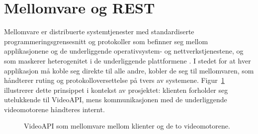 \section{Mellomvare og REST}
\label{sec:mellomvare-rest}


Mellomvare er distribuerte systemtjenester med standardiserte programmeringsgrensesnitt og protokoller som befinner seg mellom applikasjonene og de underliggende operativsystem- og nettverkstjenestene, og som maskerer heterogenitet i de underliggende plattformene \cite{bernstein1996}. I stedet for at hver applikasjon må koble seg direkte til alle andre, kobler de seg til mellomvaren, som håndterer ruting og protokolloversettelse på tvers av systemene. Figur~\ref{fig:mellomvare} illustrerer dette prinsippet i kontekst av prosjektet: klienten forholder seg utelukkende til VideoAPI, mens kommunikasjonen med de underliggende videomotorene håndteres internt.

\begin{figure}[htbp]
\centering
{}
\caption{VideoAPI som mellomvare mellom klienter og de to videomotorene.}
\label{fig:mellomvare}
\end{figure}

